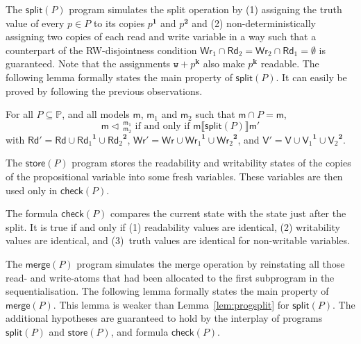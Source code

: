 \documentclass{llncs}
\newcommand{\progStore}{\mathsf{store}}
\newcommand{\progOkChange}{\mathsf{check}}
\newcommand{\progsplit}{\mathsf{split}}
\newcommand{\progmerge}{\mathsf{merge}}
\newcommand{\cp}[2]{{#2}^\mathbf{#1}}
\newcommand{\modl}{\mathsf m}
\newcommand{\splt}[3]{ #1 \triangleleft \, ^{#2}_{#3} }
\newcommand{\readset}{\mathsf{Rd}}
\newcommand{\valuset}{\mathsf{V}}
\newcommand{\writeset}{\mathsf{Wr}}
\newcommand{\assgntopW}[1]{{\mathtt w {+} #1}}
\newcommand{\intPgm}[1]{\llbracket #1 \rrbracket}
\newcommand{\propset}{\mathbb P}
\newcommand{\modinter}{\cap}
\begin{document}
The $\progsplit(P)$ program simulates the split operation by 
(1) assigning the truth value of every $p \in P$ to its copies $\cp 1 p$ and $\cp 2 p$ and
(2) non-deterministically assigning
two copies of each read and write variable in a way such that a counterpart of the RW-disjointness condition
$\writeset_1 \cap \readset_2 = \writeset_2 \cap \readset_1 = \emptyset$ is guaranteed.  
Note that the assignments $\assgntopW{ \cp{k}{p} }$ also make $\cp{k}{p} $ readable.
The following lemma formally states the main property of $\progsplit(P)$.
It can easily be proved by following the previous observations.

\begin{lemma}\label{lem:progsplit}
For all $P \subseteq \propset$, and all models $\modl$, $\modl_1$ and $\modl_2$ such that
$\modl \modinter P = \modl$,
$$ \splt \modl {\modl_1} {\modl_2} \text{ if and only if }
\modl \intPgm{\progsplit(P)} \modl'$$ with
$\readset' = \readset \cup \cp 1 {\readset_1} \cup \cp 2 {\readset_2}$,
$\writeset' = \writeset \cup \cp 1 {\writeset_1} \cup \cp 2 {\writeset_2}$, and
$\valuset' = \valuset \cup \cp 1 {\valuset_1} \cup \cp 2 {\valuset_2}$.
\end{lemma}

The $\progStore(P)$ program stores the readability and writability states of the
copies of the propositional variable into some fresh variables.
These variables are then used only in $\progOkChange(P)$.

The formula $\progOkChange(P)$ compares the current state with the state just after the split.
It is true if and only if
(1) readability values are identical, 
(2) writability values are identical, and
(3)~truth values are identical for non-writable variables.

The $\progmerge(P)$ program simulates the merge operation by reinstating all those 
read- and write-atoms that had been allocated to the first subprogram in the sequentialisation.
The following lemma formally states the main property of $\progmerge(P)$.
This lemma is weaker than Lemma~\ref{lem:progsplit} for $\progsplit(P)$.
The additional hypotheses are guaranteed to hold by the interplay of programs $\progsplit(P)$ and $\progStore(P)$,
and formula $\progOkChange(P)$.
\end{document}
